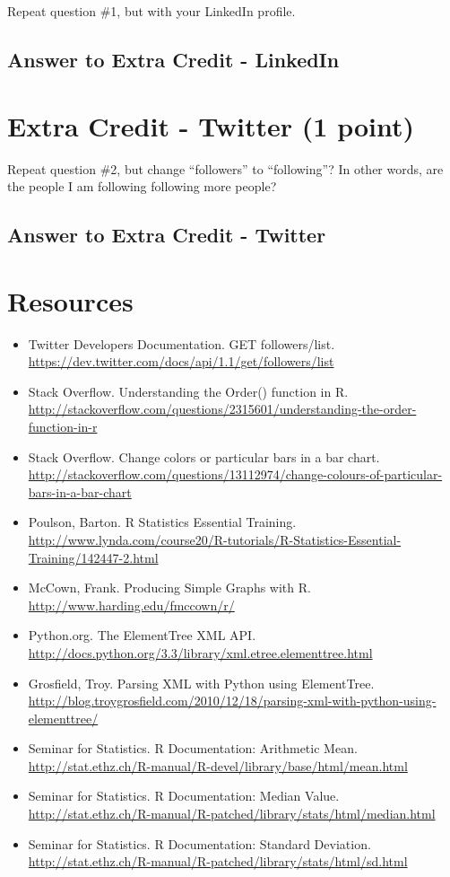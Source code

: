 \documentclass{article}
\begin{document}
Repeat question \#1, but with your LinkedIn profile.

\subsection*{Answer to Extra Credit - LinkedIn}

\clearpage

\section*{Extra Credit - Twitter (1 point)}

Repeat question \#2, but change ``followers'' to ``following''? In other words, are the people I am following following more people?

\subsection*{Answer to Extra Credit - Twitter}

\clearpage

\section*{Resources}

\begin{itemize}
\item Twitter Developers Documentation. GET followers/list. \url{https://dev.twitter.com/docs/api/1.1/get/followers/list}
\item Stack Overflow. Understanding the Order() function in R. \url{http://stackoverflow.com/questions/2315601/understanding-the-order-function-in-r}
\item Stack Overflow. Change colors or particular bars in a bar chart. \url{http://stackoverflow.com/questions/13112974/change-colours-of-particular-bars-in-a-bar-chart}
\item Poulson, Barton. R Statistics Essential Training. \url{http://www.lynda.com/course20/R-tutorials/R-Statistics-Essential-Training/142447-2.html}
\item McCown, Frank. Producing Simple Graphs with R. \url{http://www.harding.edu/fmccown/r/}
\item Python.org. The ElementTree XML API. \url{http://docs.python.org/3.3/library/xml.etree.elementtree.html}
\item Grosfield, Troy. Parsing XML with Python using ElementTree. \url{http://blog.troygrosfield.com/2010/12/18/parsing-xml-with-python-using-elementtree/}
\item Seminar for Statistics. R Documentation: Arithmetic Mean. \url{http://stat.ethz.ch/R-manual/R-devel/library/base/html/mean.html}
\item Seminar for Statistics. R Documentation: Median Value. \url{http://stat.ethz.ch/R-manual/R-patched/library/stats/html/median.html}
\item Seminar for Statistics. R Documentation: Standard Deviation. \url{http://stat.ethz.ch/R-manual/R-patched/library/stats/html/sd.html}
\end{itemize}
\end{document}
